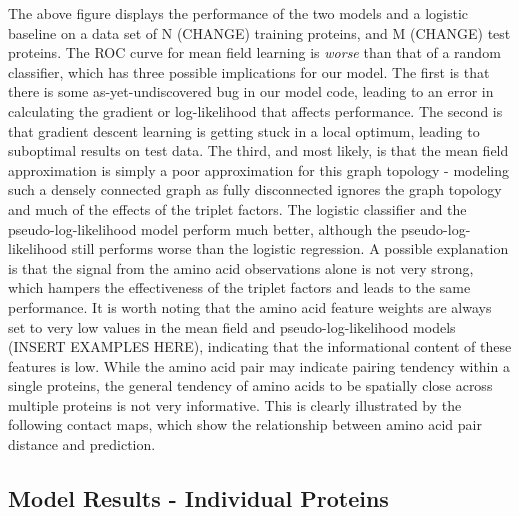 \documentclass{article}
\begin{document}
The above figure displays the performance of the two models and a logistic baseline on a data set of N (CHANGE) training proteins, and M (CHANGE) test proteins. The ROC curve for  mean field learning is \textit{worse} than that of a random classifier, which has three possible implications for our model. The first is that there is some as-yet-undiscovered bug in our model code, leading to an error in calculating the gradient or log-likelihood that affects performance. The second is that gradient descent learning is getting stuck in a local optimum, leading to suboptimal results on test data. The third, and most likely, is that the mean field approximation is simply a poor approximation for this graph topology - modeling such a densely connected graph as fully disconnected ignores the graph topology and much of the effects of the triplet factors. The logistic classifier and the pseudo-log-likelihood model perform much better, although the pseudo-log-likelihood still performs worse than the logistic regression. A possible explanation is that the signal from the amino acid observations alone is not very strong, which hampers the effectiveness of the triplet factors and leads to the same performance. It is worth noting that the amino acid feature weights are always set to very low values in the mean field and pseudo-log-likelihood models (INSERT EXAMPLES HERE), indicating that the informational content of these features is low. While the amino acid pair may indicate pairing tendency within a single proteins, the general tendency of amino acids to be spatially close across multiple proteins is not very informative. This is clearly illustrated by the following contact maps, which show the relationship between amino acid pair distance and prediction. 

\subsection{Model Results - Individual Proteins}
\end{document}

